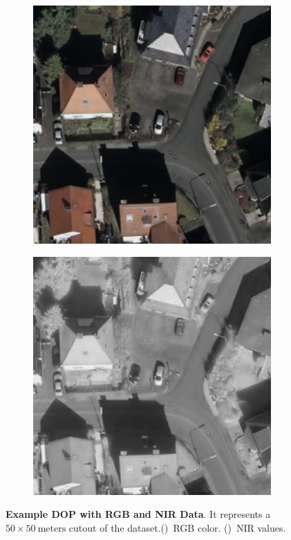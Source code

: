 \begin{figure}[h]
    \centering
    \begin{subfigure}{0.35\textwidth}
        \includegraphics[width=\textwidth]{images/dop_example/rgb}
        \caption{}
        \label{fig:rgb_example}
    \end{subfigure}
    \begin{subfigure}{0.35\textwidth}
        \includegraphics[width=\textwidth]{images/dop_example/nir}
        \caption{}
        \label{fig:nir_example}
    \end{subfigure}
    \caption[Example DOP with RGB and NIR Data]
    {\textbf{Example DOP with RGB and NIR Data}. It represents a $50\times 50~\text{meters}$ cutout of the dataset.()~RGB color. ()~NIR values.}
    \label{fig:dop_rgb_nir_example}
\end{figure}


